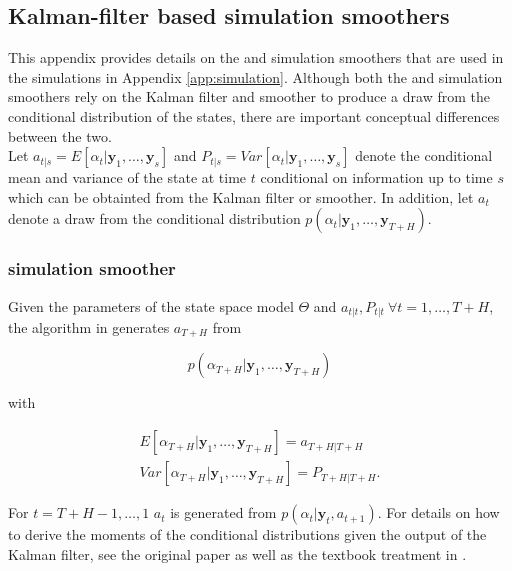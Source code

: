 \documentclass[notitlepage,a4paper,12pt]{article}
\begin{document}
\begin{ThreePartTable}
\pagebreak
\newpage

\section{Kalman-filter based simulation smoothers}\label{app:kalmansimsmoothers}

This appendix provides details on the \citet{carterkohn1994_biomtr} and \citet{durbinkoopman2002_biomtr} simulation smoothers that are used in the simulations in Appendix \ref{app:simulation}. Although both the \citet{carterkohn1994_biomtr} and \citet{durbinkoopman2002_biomtr} simulation smoothers rely on the Kalman filter and smoother to produce a draw from the conditional distribution of the states, there are important conceptual differences between the two. \\

Let $a_{t|s} = E[\alpha_t|\mathbf{y}_1, \dots, \mathbf{y}_s]$ and $P_{t|s} = Var[\alpha_t|\mathbf{y}_1, \dots, \mathbf{y}_s]$ denote the conditional mean and variance of the state at time $t$ conditional on information up to time $s$ which can be obtainted from the Kalman filter or smoother. In addition, let $a_t$ denote a draw from the conditional distribution $p(\alpha_t | \mathbf{y}_1, \dots, \mathbf{y}_{T+H})$. 

\subsubsection*{\citet{carterkohn1994_biomtr} simulation smoother}

Given the parameters of the state space model $\Theta$ and  $a_{t|t}, P_{t|t} \: \forall t = 1, \dots, T+H$, the algorithm in \citet{carterkohn1994_biomtr} generates $a_{T+H}$ from 

$$
p(\alpha_{T+H}|\mathbf{y}_1, \dots, \mathbf{y}_{T+H})
$$

\noindent with

\begin{align*}
    E[\alpha_{T+H}|\mathbf{y}_1, \dots, \mathbf{y}_{T+H}] = a_{T+H|T+H} \\
    Var[\alpha_{T+H}|\mathbf{y}_1, \dots, \mathbf{y}_{T+H}] = P_{T+H|T+H}.
\end{align*}

 For $t=T+H-1, \dots, 1$ $a_t$ is generated from $p(\alpha_{t}|\mathbf{y}_t, a_{t+1})$. For details on how to derive the moments of the conditional distributions given the output of the Kalman filter, see the original paper as well as the textbook treatment in \citet{KimNelson1999mit}.


\end{ThreePartTable}
\end{document}
